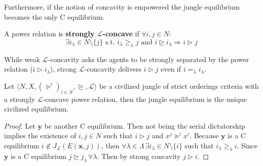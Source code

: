 


Furthermore, if the notion of concavity is empowered the jungle equilibrium becomes the only C equilibrium.

\begin{definition}
    A power relation is \textbf{strongly $\mathcal{L}$-concave} if $\forall i,j\in N$:
    \[\exists i_{\lambda}\in N\setminus\{j\}\text{ s.t. }i_{\lambda}\geq_{\lambda}j\text{ and }i\trianglerighteq i_{\lambda}\Rightarrow i\triangleright j\]
\end{definition}

While weak $\mathcal{L}$-concavity asks the agents to be strongly separated by the power relation ($i\triangleright i_{\lambda}$), strong $\mathcal{L}$-concavity delivers $i\triangleright j$ even if $i=_{\lambda} i_{\lambda}$.

\begin{proposition}\label{Prop: undivisible, strictly concave L}
    Let $\langle N,X,(\succeq^i)_{i\in N}, \trianglerighteq, \mathcal{L}\rangle$ be a civilized jungle of strict orderings criteria with a strongly $\mathcal{L}$-concave power relation, then the jungle equilibrium is the unique civilized equilibrium.

    \begin{proof}
        Let $\textbf{y}$ be another C equilibrium. Then not being the serial dictatorship implies the existence of $i,j\in N$ such that $i\triangleright j$ and $x^j\succeq^ix^i$. Because $\textbf{y}$ is a C equilibrium $i\notin J_{\mathcal{L}}(E(\textbf{x},j))$, then $\forall\lambda\in\Lambda\,\exists i_{\lambda}\in N\setminus\{i\}$ such that $i_{\lambda}\geq_{\lambda}i$. Since $\textbf{y}$ is a C equilibrium $j\trianglerighteq j_{\lambda}\,\forall\lambda$. Then by strong concavity $j\triangleright i$.  
    \end{proof}
\end{proposition}

\newpage


